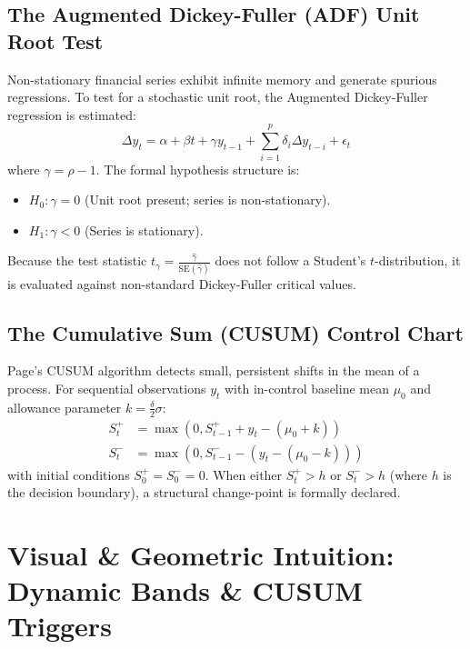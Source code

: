 \subsection{The Augmented Dickey-Fuller (ADF) Unit Root Test}
Non-stationary financial series exhibit infinite memory and generate spurious regressions. To test for a stochastic unit root, the Augmented Dickey-Fuller regression is estimated:
\begin{equation}
\Delta y_t = \alpha + \beta t + \gamma y_{t-1} + \sum_{i=1}^p \delta_i \Delta y_{t-i} + \epsilon_t
\label{eq:adf_regression}
\end{equation}
where $\gamma = \rho - 1$.
The formal hypothesis structure is:
\begin{itemize}
    \item $H_0: \gamma = 0$ (Unit root present; series is non-stationary).
    \item $H_1: \gamma < 0$ (Series is stationary).
\end{itemize}
Because the test statistic $t_\gamma = \frac{\hat{\gamma}}{\text{SE}(\hat{\gamma})}$ does not follow a Student's $t$-distribution, it is evaluated against non-standard Dickey-Fuller critical values.

\subsection{The Cumulative Sum (CUSUM) Control Chart}
Page's CUSUM algorithm detects small, persistent shifts in the mean of a process. For sequential observations $y_t$ with in-control baseline mean $\mu_0$ and allowance parameter $k = \frac{\delta}{2} \sigma$:
\begin{align}
S_t^+ &= \max\left(0, S_{t-1}^+ + y_t - (\mu_0 + k)\right) \label{eq:cusum_up} \\
S_t^- &= \max\left(0, S_{t-1}^- - (y_t - (\mu_0 - k))\right) \label{eq:cusum_down}
\end{align}
with initial conditions $S_0^+ = S_0^- = 0$. When either $S_t^+ > h$ or $S_t^- > h$ (where $h$ is the decision boundary), a structural change-point is formally declared.

\section{Visual \& Geometric Intuition: Dynamic Bands \& CUSUM Triggers}

